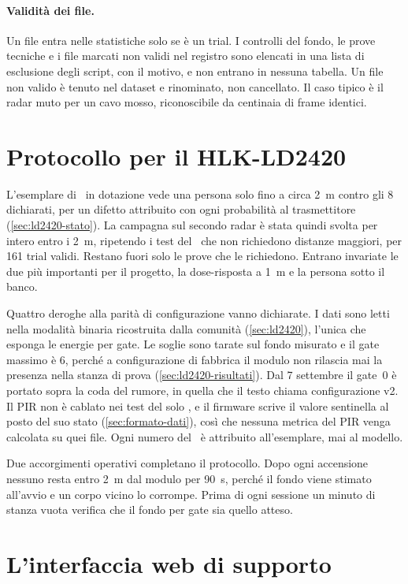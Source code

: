 \paragraph{Validità dei file.} Un file entra nelle statistiche solo se è un trial.
I controlli del fondo, le prove tecniche e i file marcati non validi nel registro
sono elencati in una lista di esclusione degli script, con il motivo, e non entrano
in nessuna tabella. Un file non valido è tenuto nel dataset e rinominato, non
cancellato. Il caso tipico è il radar muto per un cavo mosso, riconoscibile da
centinaia di frame identici.

\section{Protocollo per il HLK-LD2420}
\label{sec:protocollo-ld2420}

L'esemplare di \ldc\ in dotazione vede una persona solo fino a circa 2~m contro gli
8 dichiarati, per un difetto attribuito con ogni probabilità al trasmettitore
(\cref{sec:ld2420-stato}). La campagna sul secondo radar è stata quindi svolta per
intero entro i 2~m, ripetendo i test del \ldb\ che non richiedono
distanze maggiori, per 161 trial validi. Restano fuori solo le prove che le
richiedono. Entrano invariate le due più importanti per il progetto, la dose-risposta
a 1~m e la persona sotto il banco.

Quattro deroghe alla parità di configurazione vanno dichiarate. I dati sono letti
nella modalità binaria ricostruita dalla comunità (\cref{sec:ld2420}), l'unica che
esponga le energie per gate. Le soglie sono tarate sul fondo misurato e il gate
massimo è 6, perché a configurazione di fabbrica il modulo non rilascia mai la
presenza nella stanza di prova (\cref{sec:ld2420-risultati}). Dal 7 settembre il
gate~0 è portato sopra la coda del rumore, in quella che il testo chiama
configurazione v2. Il PIR non è cablato nei test del solo \ldc, e il firmware scrive
il valore sentinella al posto del suo stato (\cref{sec:formato-dati}), così che
nessuna metrica del PIR venga calcolata su quei file. Ogni numero del \ldc\ è
attribuito all'esemplare, mai al modello.

Due accorgimenti operativi completano il protocollo. Dopo ogni accensione nessuno
resta entro 2~m dal modulo per 90~s, perché il fondo viene stimato all'avvio e un
corpo vicino lo corrompe. Prima di ogni sessione un minuto di stanza vuota verifica
che il fondo per gate sia quello atteso.

\section{L'interfaccia web di supporto}
\label{sec:webui}
\label{cap:webui}

